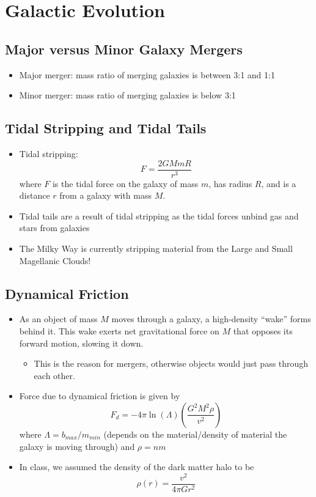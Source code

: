 \documentclass{book}
\begin{document}
\section{Galactic Evolution}
\subsection{Major versus Minor Galaxy Mergers}
\begin{itemize}
    \item Major merger: mass ratio of merging galaxies is between 3:1 and 1:1
    \item Minor merger: mass ratio of merging galaxies is below 3:1
\end{itemize}
\subsection{Tidal Stripping and Tidal Tails}
\begin{itemize}
    \item Tidal stripping: $$F = \frac{2 G M m R}{r^3}$$ where $F$ is the tidal force on the galaxy of mass $m$, has radius $R$, and is a distance $r$ from a galaxy with mass $M$.
    \item Tidal tails are a result of tidal stripping as the tidal forces unbind gas and stars from galaxies
    \item The Milky Way is currently stripping material from the Large and Small Magellanic Clouds!
\end{itemize}
\subsection{Dynamical Friction}
\begin{itemize}
    \item As an object of mass $M$ moves through a galaxy, a high-density ``wake'' forms behind it. This wake exerts net gravitational force on $M$ that opposes its forward motion, slowing it down.
          \begin{itemize}
              \item This is the reason for mergers, otherwise objects would just pass through each other.
          \end{itemize}
    \item Force due to dynamical friction is given by $$F_d = - 4 \pi \ln(\Lambda) \left( \frac{G^2 M^2 \rho}{v^2} \right)$$ where $\Lambda = b_{max}/m_{min}$ (depends on the material/density of material the galaxy is moving through) and $\rho = n m$
    \item In class, we assumed the density of the dark matter halo to be $$\rho (r) = \frac{v^2}{4 \pi G r^2}$$
\end{itemize}
\end{document}
